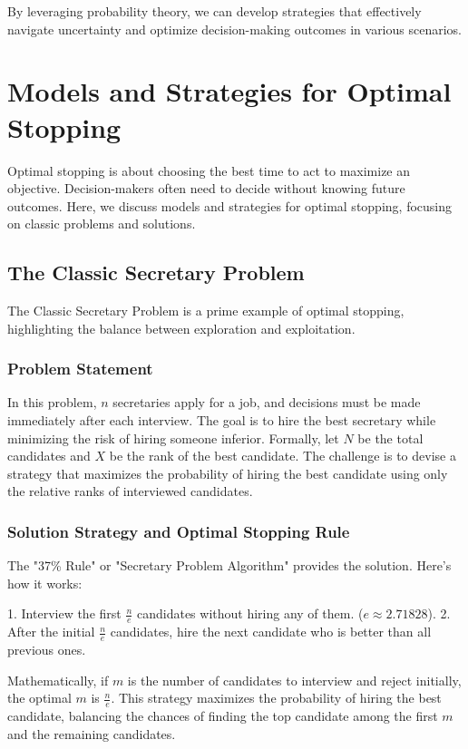 \documentclass[12pt]{book} %
\begin{document}
By leveraging probability theory, we can develop strategies that effectively navigate uncertainty and optimize decision-making outcomes in various scenarios.

\section{Models and Strategies for Optimal Stopping}

Optimal stopping is about choosing the best time to act to maximize an objective. Decision-makers often need to decide without knowing future outcomes. Here, we discuss models and strategies for optimal stopping, focusing on classic problems and solutions.

\subsection{The Classic Secretary Problem}

The Classic Secretary Problem is a prime example of optimal stopping, highlighting the balance between exploration and exploitation.

\subsubsection{Problem Statement}

In this problem, \(n\) secretaries apply for a job, and decisions must be made immediately after each interview. The goal is to hire the best secretary while minimizing the risk of hiring someone inferior. Formally, let \(N\) be the total candidates and \(X\) be the rank of the best candidate. The challenge is to devise a strategy that maximizes the probability of hiring the best candidate using only the relative ranks of interviewed candidates.

\subsubsection{Solution Strategy and Optimal Stopping Rule}

The "37\% Rule" or "Secretary Problem Algorithm" provides the solution. Here's how it works:

1. Interview the first \(\frac{n}{e}\) candidates without hiring any of them. (\(e \approx 2.71828\)).
2. After the initial \(\frac{n}{e}\) candidates, hire the next candidate who is better than all previous ones.

Mathematically, if \(m\) is the number of candidates to interview and reject initially, the optimal \(m\) is \(\frac{n}{e}\). This strategy maximizes the probability of hiring the best candidate, balancing the chances of finding the top candidate among the first \(m\) and the remaining candidates. 
\end{document}
